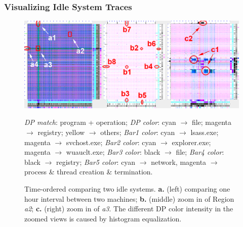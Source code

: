 \subsubsection{Visualizing Idle System Traces}
\label{sec:idle}

\begin{figure}[htb]
\includegraphics[width=1.0\textwidth]{dep-idle-dp.png}
\caption{Time-ordered \VDP{} comparing two idle systems.
{\bf a.} (left) comparing one hour interval between two machines;
{\bf b.} (middle) zoom in of Region {\em a2};
{\bf c.} (right) zoom in of {\em a3}.
The different DP color intensity in the zoomed views is caused by
histogram equalization.
}
\label{fig:idle-dp}
{\it DP match}: program + operation;
{\it DP color}: cyan $\rightarrow$ file; magenta $\rightarrow$ registry; yellow $\rightarrow$ others;
{\it Bar1 color}: cyan $\rightarrow$ lsass.exe; magenta $\rightarrow$ svchost.exe;
{\it Bar2 color}: cyan $\rightarrow$ explorer.exe; magenta $\rightarrow$ wuauclt.exe;
{\it Bar3 color}: black $\rightarrow$ file;
{\it Bar4 color}: black $\rightarrow$ registry;
{\it Bar5 color}: cyan $\rightarrow$ network, magenta $\rightarrow$ process \& thread creation \& termination.
\end{figure}


